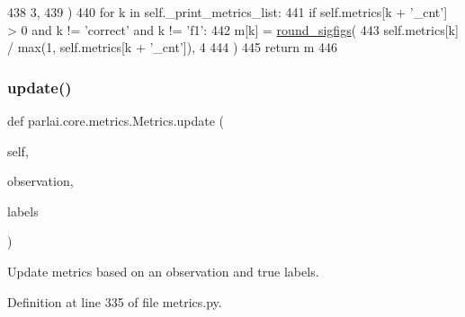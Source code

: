 \begin{DoxyCode}
438                         3,
439                     )
440             \textcolor{keywordflow}{for} k \textcolor{keywordflow}{in} self.\_print\_metrics\_list:
441                 \textcolor{keywordflow}{if} self.metrics[k + \textcolor{stringliteral}{'\_cnt'}] > 0 \textcolor{keywordflow}{and} k != \textcolor{stringliteral}{'correct'} \textcolor{keywordflow}{and} k != \textcolor{stringliteral}{'f1'}:
442                     m[k] = \hyperlink{namespaceparlai_1_1agents_1_1legacy__agents_1_1seq2seq_1_1utils__v0_af377ec61bfc0423461e7b409ffc883b9}{round\_sigfigs}(
443                         self.metrics[k] / max(1, self.metrics[k + \textcolor{stringliteral}{'\_cnt'}]), 4
444                     )
445         \textcolor{keywordflow}{return} m
446 
\end{DoxyCode}
\mbox{\label{classparlai_1_1core_1_1metrics_1_1Metrics_ab1a5a659f2c5747af5d0b674dc647742}} 
\subsubsection{\texorpdfstring{update()}{update()}}
{\footnotesize\ttfamily def parlai.\+core.\+metrics.\+Metrics.\+update (\begin{DoxyParamCaption}\item[{}]{self,  }\item[{}]{observation,  }\item[{}]{labels }\end{DoxyParamCaption})}

\begin{DoxyVerb}Update metrics based on an observation and true labels.
\end{DoxyVerb}
 

Definition at line 335 of file metrics.\+py.


